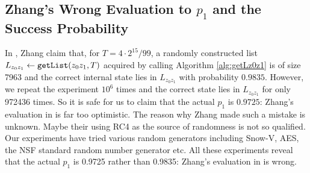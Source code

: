 \subsection{Zhang's Wrong Evaluation to $p_1$ and the Success Probability}\label{sec:ZhangWrongP1}
In \cite{AC:Zhang19}, Zhang \etal claim that, for $T=4\cdot 2^{15}/99$, a randomly constructed list $L_{z_0z_1}\leftarrow {\tt getList}(z_0z_1, T)$ acquired by calling Algorithm \ref{alg:getLz0z1} is of size 7963  and the correct internal state lies in $L_{z_0z_1}$ with probability $0.9835$.
However, we repeat the experiment $10^6$ times and the correct state lies in $L_{z_0z_1}$ for only 972436 times.
So it is safe for us to claim that the actual $p_1$ is $0.9725$: Zhang's evaluation in \cite{AC:Zhang19} is far too optimistic.
The reason why Zhang \etal made such a mistake is unknown.
Maybe their using RC4 as the source of randomness is not so qualified.
Our experiments have tried various random generators including Snow-V, AES, the NSF standard random number generator etc.
All these experiments reveal that the actual $p_1$ is 0.9725 rather than 0.9835: Zhang's evaluation in \cite{AC:Zhang19} is wrong.


